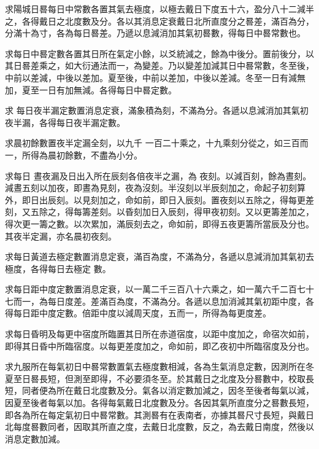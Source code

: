 \begin{pinyinscope}
 求陽城日晷每日中常數各置其氣去極度，以極去戴日下度五十六，盈分八十二減半之，各得戴日之北度數及分。各以其消息定衰戴日北所直度分之晷差，滿百為分，分滿十為寸，各為每日晷差。乃遞以息減消加其氣初晷數，得每日中晷常數也。



 求每日中晷定數各置其日所在氣定小餘，以爻統減之，餘為中後分。置前後分，以其日晷差乘之，如大衍通法而一，為變差。乃以變差加減其日中晷常數，冬至後，中前以差減，中後以差加。夏至後，中前以差加，中後以差減。冬至一日有減無加，夏至一日有加無減。各得每日中晷定數。



 求
 每日夜半漏定數置消息定衰，滿象積為刻，不滿為分。各遞以息減消加其氣初夜半漏，各得每日夜半漏定數。



 求晨初餘數置夜半定漏全刻，以九千
 一百二十乘之，十九乘刻分從之，如三百而一，所得為晨初餘數，不盡為小分。



 求每日
 晝夜漏及日出入所在辰刻各倍夜半之漏，為
 夜刻。以減百刻，餘為晝刻。減晝五刻以加夜，即晝為見刻，夜為沒刻。半沒刻以半辰刻加之，命起子初刻算外，即日出辰刻。以見刻加之，命如前，即日入辰刻。置夜刻以五除之，得每更差刻，又五除之，得每籌差刻。以昏刻加日入辰刻，得甲夜初刻。又以更籌差加之，得次更一籌之數。以次累加，滿辰刻去之，命如前，即得五夜更籌所當辰及分也。其夜半定漏，亦名晨初夜刻。



 求每日黃道去極定數置消息定衰，滿百為度，不滿為分，各遞以息減消加其氣初去極度，各得每日去極定
 數。



 求每日距中度定數置消息定衰，以一萬二千三百八十六乘之，如一萬六千二百七十七而一，為每日度差。差滿百為度，不滿為分。各遞以息加消減其氣初距中度，各得每日距中度定數。倍距中度以減周天度，五而一，所得為每更度差。



 求每日昏明及每更中宿度所臨置其日所在赤道宿度，以距中度加之，命宿次如前，即得其日昏中所臨宿度。以每更差度加之，命如前，即乙夜初中所臨宿度及分也。



 求九服所在每氣初日中晷常數置氣去極度數相減，各為生氣消息定數，因測所在冬夏至日晷長短，但測至即得，不必要須冬至。於其戴日之北度及分晷數中，校取長短，同者便為所在戴日北度數及分。氣各以消定數加減之，因冬至後者每氣以減，因夏至後者每氣以加。各得每氣戴日北度數及分。各因其氣所直度分之晷數長短，即各為所在每定氣初日中晷常數。其測晷有在表南者，亦據其晷尺寸長短，與戴日北每度晷數同者，因取其所直之度，去戴日北度數，反之，為去戴日南度，然後以消息定數加減。




\end{pinyinscope}
